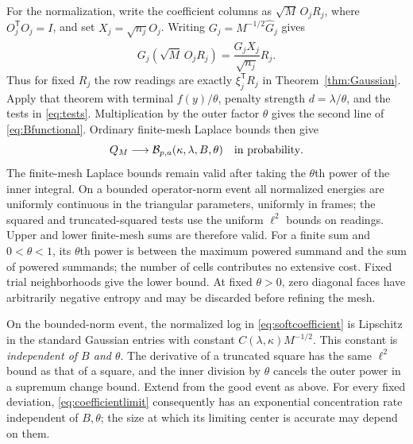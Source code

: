 \documentclass[11pt]{article}
\numberwithin{equation}{section}
\theoremstyle{definition}
\begin{document}
For the normalization, write the coefficient columns as $\sqrt M\,O_jR_j$, where $O_j^{\mathsf T}O_j=I$, and set $X_j=\sqrt{n_j}O_j$. Writing $G_j=M^{-1/2}\widehat G_j$ gives
\[
G_j(\sqrt M\,O_jR_j)
=\frac{\widehat G_jX_j}{\sqrt{n_j}}R_j.
\]
Thus for fixed $R_j$ the row readings are exactly $\xi_j^{\mathsf T}R_j$ in Theorem~\ref{thm:Gaussian}. Apply that theorem with terminal $f(y)/\theta$, penalty strength $d=\lambda/\theta$, and the tests in \eqref{eq:tests}. Multiplication by the outer factor $\theta$ gives the second line of \eqref{eq:Bfunctional}. Ordinary finite-mesh Laplace bounds then give
\begin{equation}\label{eq:coefficientlimit}
Q_M\longrightarrow\mathcal B_{p,a}(\kappa,\lambda,B,\theta)
\quad\hbox{in probability}.
\end{equation}
The finite-mesh Laplace bounds remain valid after taking the $\theta$th power of the inner integral. On a bounded operator-norm event all normalized energies are uniformly continuous in the triangular parameters, uniformly in frames; the squared and truncated-squared tests use the uniform $\ell^2$ bounds on readings. Upper and lower finite-mesh sums are therefore valid. For a finite sum and $0<\theta<1$, its $\theta$th power is between the maximum powered summand and the sum of powered summands; the number of cells contributes no extensive cost. Fixed trial neighborhoods give the lower bound. At fixed $\theta>0$, zero diagonal faces have arbitrarily negative entropy and may be discarded before refining the mesh.

On the bounded-norm event, the normalized log in \eqref{eq:softcoefficient} is Lipschitz in the standard Gaussian entries with constant $C(\lambda,\kappa)M^{-1/2}$. This constant is \emph{independent of $B$ and $\theta$}. The derivative of a truncated square has the same $\ell^2$ bound as that of a square, and the inner division by $\theta$ cancels the outer power in a supremum change bound. Extend from the good event as above. For every fixed deviation, \eqref{eq:coefficientlimit} consequently has an exponential concentration rate independent of $B,\theta$; the size at which its limiting center is accurate may depend on them.
\end{document}
